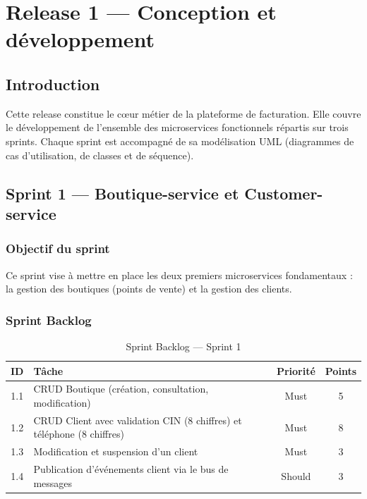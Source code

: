 \chapter{Release 1 --- Conception et développement}

\section*{Introduction}
Cette release constitue le c\oe{}ur métier de la plateforme de facturation. Elle couvre le développement de l'ensemble des microservices fonctionnels répartis sur trois sprints. Chaque sprint est accompagné de sa modélisation UML (diagrammes de cas d'utilisation, de classes et de séquence).

\section{Sprint 1 --- Boutique-service et Customer-service}

\subsection{Objectif du sprint}
Ce sprint vise à mettre en place les deux premiers microservices fondamentaux : la gestion des boutiques (points de vente) et la gestion des clients.

\subsection{Sprint Backlog}

\begin{table}[H]
\centering
\renewcommand{\arraystretch}{1.2}
\begin{tabular}{|c|p{9cm}|c|c|}
\hline
\textbf{ID} & \textbf{Tâche} & \textbf{Priorité} & \textbf{Points} \\
\hline
1.1 & CRUD Boutique (création, consultation, modification) & Must & 5 \\
\hline
1.2 & CRUD Client avec validation CIN (8 chiffres) et téléphone (8 chiffres) & Must & 8 \\
\hline
1.3 & Modification et suspension d'un client & Must & 3 \\
\hline
1.4 & Publication d'événements client via le bus de messages & Should & 3 \\
\hline
\end{tabular}
\caption{Sprint Backlog --- Sprint 1}
\label{tab:sprint1_backlog}
\end{table}

